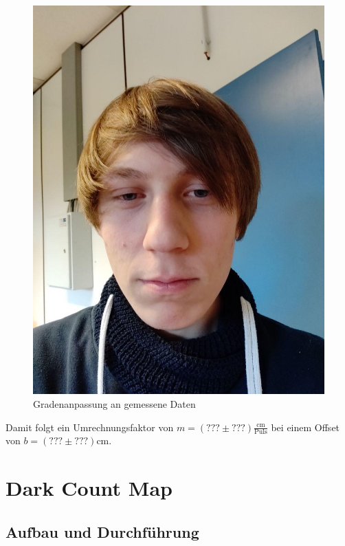 \documentclass[12pt,twoside,a4paper]{scrartcl}
\begin{document}
			\begin{figure}[H]
				\centering
					\includegraphics[width=\textwidth]{Pictures/Platzhalter.jpg}
				\caption{Gradenanpassung an gemessene Daten}
			\end{figure}

				Damit folgt ein Umrechnungsfaktor von $m = (??? \pm ???) \frac{\si{\centi \metre}}{\text{Puls}}$ bei einem Offset von $b = (??? \pm ???) \si{\centi \metre}$.


	\section{Dark Count Map}
	\label{DCM}

		\subsection{Aufbau und Durchführung}
\end{document}
